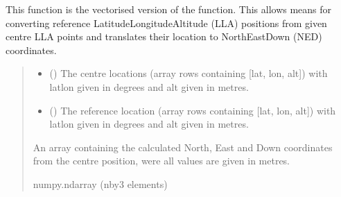 \documentclass[letterpaper,10pt,english]{sphinxmanual}
\begin{document}
\begin{fulllineitems}
\label{\detokenize{modules/util/transformations:qnav.util.transformations.lla2ned_vec}}
\pysigstartsignatures
{}
\pysigstopsignatures
\sphinxAtStartPar
This function is the vectorised version of the
{\hyperref[\detokenize{modules/util/transformations:qnav.util.transformations.lla2ned}]{}} function. This
allows means for converting reference Latitude\sphinxhyphen{}Longitude\sphinxhyphen{}Altitude (LLA)
positions from given centre LLA points and translates their location to
North\sphinxhyphen{}East\sphinxhyphen{}Down (NED) coordinates.
\begin{quote}\begin{description}
\begin{itemize}
\item {} 
\sphinxAtStartPar
{} (\sphinxstyleliteralemphasis{\sphinxupquote{ (}}\sphinxstyleliteralemphasis{\sphinxupquote{)}}) \textendash{} The centre locations (array rows containing {[}lat, lon, alt{]})
with lat\sphinxhyphen{}lon given in degrees and alt given in metres.

\item {} 
\sphinxAtStartPar
{} (\sphinxstyleliteralemphasis{\sphinxupquote{ (}}\sphinxstyleliteralemphasis{\sphinxupquote{)}}) \textendash{} The reference location (array rows containing
{[}lat, lon, alt{]}) with lat\sphinxhyphen{}lon given in degrees and alt given in
metres.

\end{itemize}

\sphinxAtStartPar
An array containing the calculated North, East and Down
coordinates from the centre position, were all values are given in
metres.

\sphinxAtStartPar
numpy.ndarray (n\sphinxhyphen{}by\sphinxhyphen{}3 elements)

\end{description}\end{quote}

\end{fulllineitems}
\end{document}
